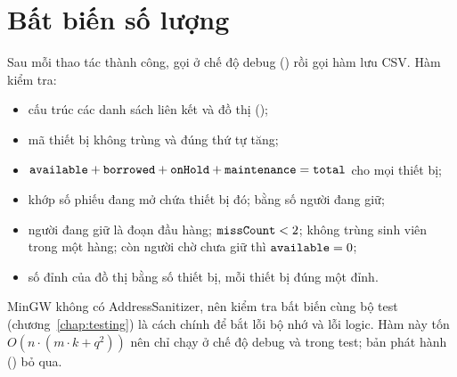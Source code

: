 \section{Bất biến số lượng}\label{sec:invariants}
Sau mỗi thao tác thành công,  gọi  ở chế độ debug () rồi gọi hàm lưu CSV. Hàm kiểm tra:
\begin{itemize}
  \item cấu trúc các danh sách liên kết và đồ thị ();
  \item mã thiết bị không trùng và đúng thứ tự tăng;
  \item $\code{available} + \code{borrowed} + \code{onHold} + \code{maintenance} = \code{total}$ cho mọi thiết bị;
  \item {} khớp số phiếu đang mở chứa thiết bị đó;  bằng số người đang giữ;
  \item người đang giữ là đoạn đầu hàng; $\code{missCount} < 2$; không trùng sinh viên trong một hàng; còn người chờ chưa giữ thì $\code{available} = 0$;
  \item số đỉnh của đồ thị bằng số thiết bị, mỗi thiết bị đúng một đỉnh.
\end{itemize}
MinGW không có AddressSanitizer, nên kiểm tra bất biến cùng bộ test (chương~\ref{chap:testing}) là cách chính để bắt lỗi bộ nhớ và lỗi logic. Hàm này tốn $O(n\cdot(m\cdot k + q^2))$ nên chỉ chạy ở chế độ debug và trong test; bản phát hành () bỏ qua.

